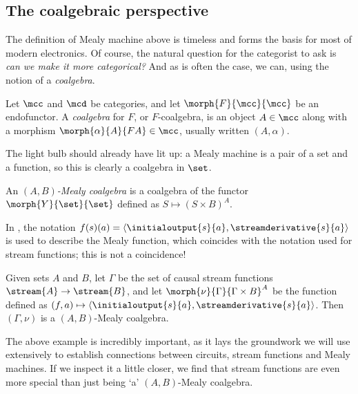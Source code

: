 \begin{example}
\end{example}

\subsection{The coalgebraic perspective}

The definition of Mealy machine above is timeless and forms the basis for most
of modern electronics.
Of course, the natural question for the categorist to ask is
\emph{can we make it more categorical?}
And as is often the case, we can, using the notion of a \emph{coalgebra}.

\begin{definition}[Coalgebra]
    Let \(\mcc\) and \(\mcd\) be categories, and let \(\morph{F}{\mcc}{\mcc}\)
    be an endofunctor.
    A \emph{coalgebra} for \(F\), or \(F\)-coalgebra, is an object
    \(A \in \mcc\) along with a morphism \(\morph{\alpha}{A}{FA} \in \mcc\),
    usually written \((A,\alpha)\).
\end{definition}

The light bulb should already have lit up: a Mealy machine is a pair of a set
and a function, so this is clearly a coalgebra in \(\set\).

\begin{definition}
    An \emph{\((A,B)\)-Mealy coalgebra} is a coalgebra of the functor
    \(\morph{Y}{\set}{\set}\) defined as \(S \mapsto (S \times B)^A\).
\end{definition}

\begin{example}
    In \cite{bonsangue2008coalgebraic}, the notation \(
        f(s)(a) = \langle{\initialoutput{s}{a},\streamderivative{s}{a}}\rangle
    \) is used to describe the Mealy function, which coincides with the notation
    used for stream functions; this is not a coincidence!

    Given sets \(A\) and \(B\), let \(\Gamma\) be the set of causal stream
    functions \(\stream{A} \to \stream{B}\), and let
    \(\morph{\nu}{\Gamma}{\Gamma \times B}^A\) be the function defined as \(
        (f, a) \mapsto \langle{\initialoutput{s}{a},\streamderivative{s}{a}}\rangle
    \).
    Then \((\Gamma,\nu)\) is a \((A,B)\)-Mealy coalgebra.
\end{example}

The above example is incredibly important, as it lays the groundwork we will
use extensively to establish connections between circuits, stream functions and
Mealy machines.
If we inspect it a little closer, we find that stream functions are even more
special than just being `a' \((A,B)\)-Mealy coalgebra.


